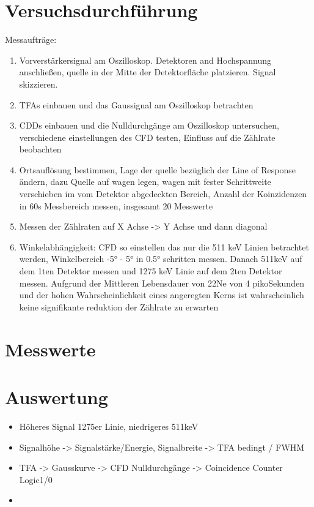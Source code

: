 \documentclass{article}
\begin{document}
    \section{Versuchsdurchführung}
        Messaufträge:
        \begin{enumerate}
            \item Vorverstärkersignal am Oszilloskop. Detektoren and Hochspannung anschließen, quelle in der Mitte der Detektorfläche platzieren. Signal skizzieren.  
            \item TFAs einbauen und das Gaussignal am Oszilloskop betrachten
            \item CDDs einbauen und die Nulldurchgänge am Oszilloskop untersuchen, verschiedene einstellungen des CFD testen, Einfluss auf die Zählrate beobachten
            \item Ortsauflösung bestimmen, Lage der quelle bezüglich der Line of Response ändern, dazu Quelle auf wagen legen, wagen mit fester Schrittweite verschieben
            im vom Detektor abgedeckten Bereich, Anzahl der Koinzidenzen in 60s Messbereich messen, insgesamt 20 Messwerte
            \item Messen der Zählraten auf X Achse -> Y Achse und dann diagonal 
            \item Winkelabhängigkeit: CFD so einstellen das nur die 511 keV Linien betrachtet werden, Winkelbereich -5° - 5° in 0.5° schritten messen.
            Danach 511keV auf dem 1ten Detektor messen und 1275 keV Linie auf dem 2ten Detektor messen. Aufgrund der Mittleren Lebensdauer von 22Ne von 4 pikoSekunden und der
            hohen Wahrscheinlichkeit eines angeregten Kerns ist wahrscheinlich keine signifikante reduktion der Zählrate zu erwarten
        \end{enumerate}
    \section{Messwerte}

    \section{Auswertung}
        \begin{itemize}
            \item Höheres Signal 1275er Linie, niedrigeres 511keV
            \item Signalhöhe -> Signalstärke/Energie, Signalbreite -> TFA bedingt / FWHM
            \item TFA -> Gausskurve -> CFD Nulldurchgänge -> Coincidence Counter Logic1/0
            \item 
        \end{itemize}
\end{document}
